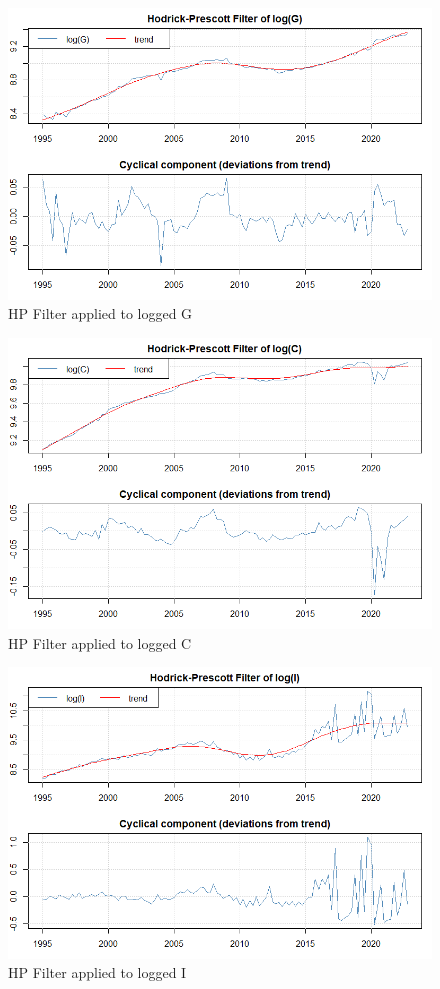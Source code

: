 \documentclass[a4paper,11pt]{article}
\begin{document}
\begin{figure}[H]
    \centering
    \includegraphics[scale=0.65]{HPFilter_G.png}
    \caption{HP Filter applied to logged G}
    \label{fig:my_label}
\end{figure}
\begin{figure}[H]
    \centering
    \includegraphics[scale=0.65]{HPFilter_C.png}
    \caption{HP Filter applied to logged C}
    \label{fig:my_label}
\end{figure}
\begin{figure}[H]
    \centering
    \includegraphics[scale=0.65]{HPFilter_I.png}
    \caption{HP Filter applied to logged I}
    \label{fig:my_label}
\end{figure}
\end{document}
